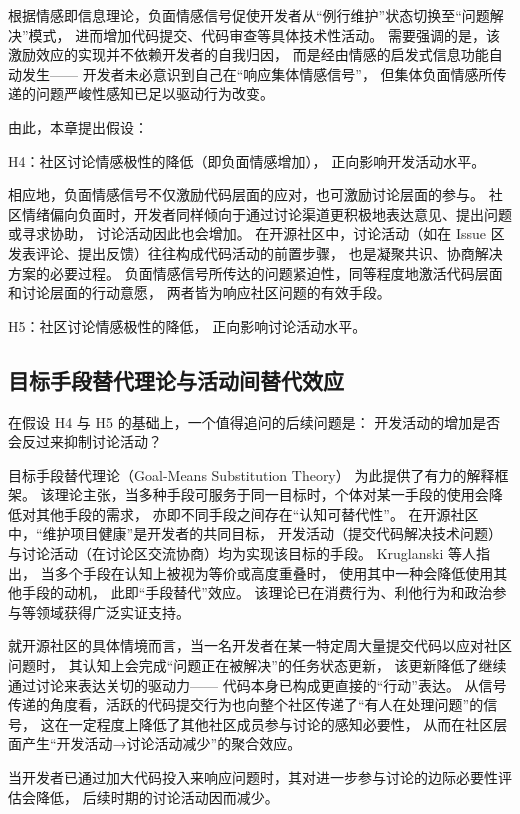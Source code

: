 \documentclass[
    type = master, %
    degree = professional,        %
    decl-page,  %
    twoside,                %
    fontset = fandol %
  ]{njuthesis}
\begin{document}
根据情感即信息理论，负面情感信号促使开发者从“例行维护”状态切换至“问题解决”模式，
进而增加代码提交、代码审查等具体技术性活动。
需要强调的是，该激励效应的实现并不依赖开发者的自我归因，
而是经由情感的启发式信息功能自动发生——
开发者未必意识到自己在“响应集体情感信号”，
但集体负面情感所传递的问题严峻性感知已足以驱动行为改变。

由此，本章提出假设：

H4：社区讨论情感极性的降低（即负面情感增加），
正向影响开发活动水平。

相应地，负面情感信号不仅激励代码层面的应对，也可激励讨论层面的参与。
社区情绪偏向负面时，开发者同样倾向于通过讨论渠道更积极地表达意见、提出问题或寻求协助，
讨论活动因此也会增加。
在开源社区中，讨论活动（如在 Issue 区发表评论、提出反馈）往往构成代码活动的前置步骤，
也是凝聚共识、协商解决方案的必要过程\cite{guzzi2013}。
负面情感信号所传达的问题紧迫性，同等程度地激活代码层面和讨论层面的行动意愿，
两者皆为响应社区问题的有效手段。

H5：社区讨论情感极性的降低，
正向影响讨论活动水平。

\subsection{目标手段替代理论与活动间替代效应}

在假设 H4 与 H5 的基础上，一个值得追问的后续问题是：
开发活动的增加是否会反过来抑制讨论活动？

目标手段替代理论（Goal-Means Substitution Theory）\cite{kruglanski2002theory}
为此提供了有力的解释框架。
该理论主张，当多种手段可服务于同一目标时，个体对某一手段的使用会降低对其他手段的需求，
亦即不同手段之间存在“认知可替代性”。
在开源社区中，“维护项目健康”是开发者的共同目标，
开发活动（提交代码解决技术问题）与讨论活动（在讨论区交流协商）均为实现该目标的手段。
Kruglanski 等人\citeyear{kruglanski2002theory}指出，
当多个手段在认知上被视为等价或高度重叠时，
使用其中一种会降低使用其他手段的动机，
此即“手段替代”效应。
该理论已在消费行为、利他行为和政治参与等领域获得广泛实证支持。

就开源社区的具体情境而言，当一名开发者在某一特定周大量提交代码以应对社区问题时，
其认知上会完成“问题正在被解决”的任务状态更新，
该更新降低了继续通过讨论来表达关切的驱动力——
代码本身已构成更直接的“行动”表达。
从信号传递的角度看，活跃的代码提交行为也向整个社区传递了“有人在处理问题”的信号，
这在一定程度上降低了其他社区成员参与讨论的感知必要性，
从而在社区层面产生“开发活动→讨论活动减少”的聚合效应。

当开发者已通过加大代码投入来响应问题时，其对进一步参与讨论的边际必要性评估会降低，
后续时期的讨论活动因而减少。
\end{document}
